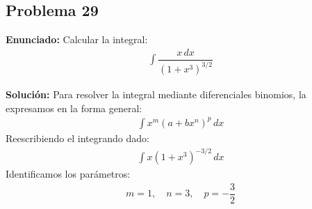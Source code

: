 \subsection*{Problema 29}
\textbf{Enunciado:} Calcular la integral:
\begin{align*}
\int \dfrac{x \, dx}{(1 + x^3)^{3/2}}
\end{align*}

\textbf{Solución:}
Para resolver la integral mediante diferenciales binomios, la expresamos en la forma general:
\begin{align*}
\int x^m (a + bx^n)^p \, dx
\end{align*}
Reescribiendo el integrando dado:
\begin{align*}
\int x (1 + x^3)^{-3/2} \, dx
\end{align*}
Identificamos los parámetros:
\begin{align*}
m = 1, \quad n = 3, \quad p = -\dfrac{3}{2}
\end{align*}

